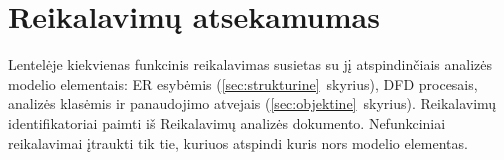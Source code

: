 
\section{Reikalavimų atsekamumas}\label{sec:analizes-atsekamumas}

Lentelėje kiekvienas funkcinis reikalavimas susietas su jį atspindinčiais
analizės modelio elementais: ER esybėmis (\ref{sec:strukturine}~skyrius),
DFD procesais, analizės klasėmis ir panaudojimo atvejais
(\ref{sec:objektine}~skyrius). Reikalavimų identifikatoriai paimti iš
Reikalavimų analizės dokumento. Nefunkciniai reikalavimai įtraukti tik tie,
kuriuos atspindi kuris nors modelio elementas.

